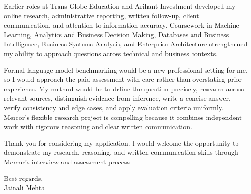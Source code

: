 \documentclass[letterpaper,11pt]{article}
\begin{document}
\bigbreak
Earlier roles at Trans Globe Education and Arihant Investment developed my online research, administrative reporting, written follow-up, client communication, and attention to information accuracy. Coursework in Machine Learning, Analytics and Business Decision Making, Databases and Business Intelligence, Business Systems Analysis, and Enterprise Architecture strengthened my ability to approach questions across technical and business contexts.

\bigbreak
Formal language-model benchmarking would be a new professional setting for me, so I would approach the paid assessment with care rather than overstating prior experience. My method would be to define the question precisely, research across relevant sources, distinguish evidence from inference, write a concise answer, verify consistency and edge cases, and apply evaluation criteria uniformly. Mercor's flexible research project is compelling because it combines independent work with rigorous reasoning and clear written communication.

\bigbreak
Thank you for considering my application. I would welcome the opportunity to demonstrate my research, reasoning, and written-communication skills through Mercor's interview and assessment process.

\bigbreak
Best regards,\\
Jainali Mehta
\end{document}
